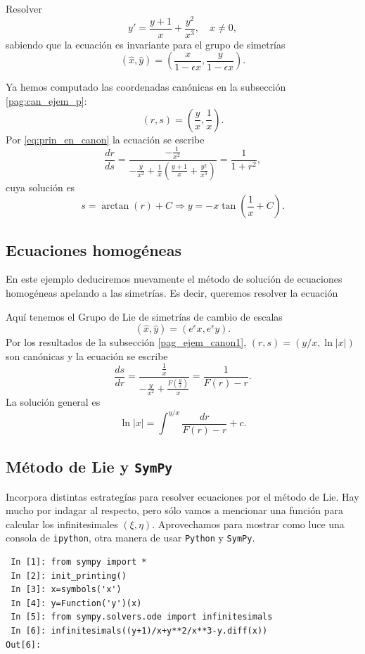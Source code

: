 \begin{ejemplo} Resolver
\[y'=\frac{y+1}{x}+\frac{y^2}{x^3},\quad x\neq 0,\]
sabiendo que la ecuación es invariante para el grupo de simetrías
\[(\hat{x},\hat{y})=\left(\frac{x}{1-\epsilon x},\frac{y}{1-\epsilon x}   \right).\]
\end{ejemplo}
Ya hemos computado las coordenadas canónicas en la subsección \ref{pag:can_ejem_p}:
\[(r,s)=\left(\frac{y}{x},\frac{1}{x}\right).\]
Por \eqref{eq:prin_en_canon} la ecuación se escribe
\[\frac{dr}{ds}=\frac{-\frac{1}{x^2} }{-\frac{y}{x^2}+\frac{1}{x}\left(
\frac{y+1}{x}+\frac{y^2}{x^3}\right)}=\frac{1}{1+r^2},\]
cuya solución es
\[s=\arctan(r)+C\Rightarrow y=-x\tan\left(\frac{1}{x}+C\right).\]



\subsection{Ecuaciones homogéneas}
\begin{ejemplo} En este ejemplo deduciremos nuevamente el método de solución de ecuaciones homogéneas apelando a las simetrías. Es decir, queremos resolver la ecuación
\end{ejemplo}
Aquí tenemos el Grupo de Lie de simetrías de cambio de escalas
\[(\hat{x},\hat{y})=(e^{\epsilon}x,e^{\epsilon}y).\] 
Por los resultados de la subsección \ref{pag_ejem_canon1}, $(r,s)=(y/x,\ln|x|)$ son canónicas y la ecuación se escribe
\[\frac{ds}{dr}=\frac{\frac{1}{x}}{-\frac{y}{x^2}+\frac{F\left(\frac{y}{x}\right)}{x}}=\frac{1}{F(r)-r}.\]
La solución general es 
\[\ln|x|=\int^{y/x}\frac{dr}{F(r)-r}+c.\]




\subsection{Método de Lie y \texttt{SymPy}}
 Incorpora distintas estrategías para resolver ecuaciones por el método de Lie. Hay mucho por indagar al respecto, pero sólo vamos a mencionar una función para calcular los infinitesimales $(\xi,\eta)$.  Aprovechamos para mostrar como luce una consola de \texttt{ipython}, otra manera de usar \texttt{Python} y \texttt{SymPy}.

\begin{lstlisting}
￼In [1]: from sympy import *
￼In [2]: init_printing()
￼In [3]: x=symbols('x')
￼In [4]: y=Function('y')(x)
￼In [5]: from sympy.solvers.ode import infinitesimals
￼In [6]: infinitesimals((y+1)/x+y**2/x**3-y.diff(x))
Out[6]: 
\end{lstlisting}

